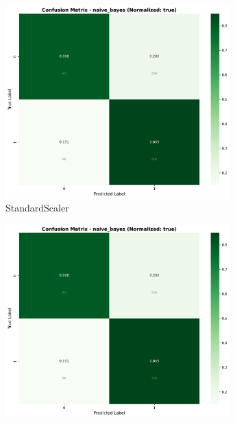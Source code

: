 \begin{figure}[H]\centering
\begin{subfigure}[b]{0.31\textwidth}\centering
\includegraphics[width=0.95\textwidth]{Result/heart_dataset/confusion_matrices/naive_bayes_numeric_dataset_StandardScaler.png}
\caption{StandardScaler}\label{fig:nb_heart_cm_standard}
\end{subfigure}\hfill
\begin{subfigure}[b]{0.31\textwidth}\centering
\includegraphics[width=0.95\textwidth]{Result/heart_dataset/confusion_matrices/naive_bayes_numeric_dataset_MinMaxScaler.png}

\end{subfigure}
\end{figure}
